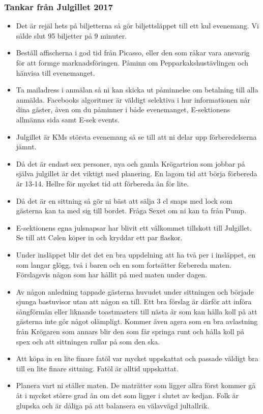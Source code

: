 \documentclass[10pt]{article}
\begin{document}
\subsubsection*{Tankar från Julgillet 2017}
\begin{itemize}
	\item Det är rejäl hets på biljetterna så gör biljettsläppet till ett kul evenemang. Vi sålde slut 95 biljetter på 9 minuter.
    \item Beställ affischerna i god tid från Picasso, eller den som råkar vara ansvarig för att formge marknadsföringen. Påminn om Pepparkakshustävlingen och hänvisa till evenemanget.
    \item Ta mailadress i anmälan så ni kan skicka ut påminnelse om betalning till alla anmälda. Facebooks algoritmer är väldigt selektiva i hur informationen når dina gäster, även om du påminner i både evenemanget, E-sektionens allmänna sida samt E-sek events.
    \item Julgillet är KMs största evenemang så se till att ni delar upp förberedelserna jämnt.
    \item Då det är endast sex personer, nya och gamla Krögartrion som jobbar på själva julgillet är det viktigt med planering. En lagom tid att börja förbereda är 13-14. Hellre för mycket tid att förbereda än för lite.
    \item Då det är en sittning så gör ni bäst att sälja 3 cl snaps med lock som gästerna kan ta med sig till bordet. Fråga Sexet om ni kan ta från Pump.
    \item E-sektionens egna julsnapsar har blivit ett välkommet tillskott till Julgillet. Se till att Cølen köper in och kryddar ett par flaskor.
    \item Under insläppet blir det det en bra uppdelning att ha två per i insläppet, en som langar glögg, två i baren och en som fortsätter förbereda maten. Förslagsvis någon som har hållit på med maten under dagen.
    \item Av någon anledning tappade gästerna huvudet under sittningen och började sjunga bastuvisor utan att någon sa till. Ett bra förslag är därför att införa sångförmän eller liknande toastmasters till nästa år som kan hålla koll på att gästerna inte gör något olämpligt. Kommer även agera som en bra avlastning från Krögaren som annars blir den som får springa runt och hålla koll på spex och att sittningen rullar på som den ska.
    \item Att köpa in en lite finare fatöl var mycket uppskattat och passade väldigt bra till en lite finare sittning. Fatöl är alltid uppskattat.
    \item Planera vart ni ställer maten. De maträtter som ligger allra först kommer gå åt i mycket större grad än om det som ligger i slutet av kedjan. Folk är glupska och är dåliga på att balansera en välavvägd jultallrik.

\end{itemize}
\end{document}
